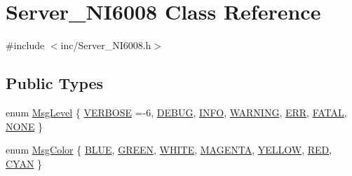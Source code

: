 \hypertarget{classServer__NI6008}{}\section{Server\+\_\+\+N\+I6008 Class Reference}
\label{classServer__NI6008}


{\ttfamily \#include $<$inc/\+Server\+\_\+\+N\+I6008.\+h$>$}

\subsection*{Public Types}
\begin{DoxyCompactItemize}
\item 
enum \hyperlink{classServer__NI6008_af1e3e3bac26355a746b5d2e548fe25be}{Msg\+Level} \{ \newline
\hyperlink{classServer__NI6008_af1e3e3bac26355a746b5d2e548fe25bea58fcd852dfcff4011a32756eda28852b}{V\+E\+R\+B\+O\+SE} =-\/6, 
\hyperlink{classServer__NI6008_af1e3e3bac26355a746b5d2e548fe25bead3eef0ad5b826981e274ce214fd3a6d3}{D\+E\+B\+UG}, 
\hyperlink{classServer__NI6008_af1e3e3bac26355a746b5d2e548fe25bea218489470a9743b7d475e86e13ea219d}{I\+N\+FO}, 
\hyperlink{classServer__NI6008_af1e3e3bac26355a746b5d2e548fe25bead7775b9a40b2a58fe2547fe9c2617093}{W\+A\+R\+N\+I\+NG}, 
\newline
\hyperlink{classServer__NI6008_af1e3e3bac26355a746b5d2e548fe25bea23728be8768fe4c119fb61ad427ed5ba}{E\+RR}, 
\hyperlink{classServer__NI6008_af1e3e3bac26355a746b5d2e548fe25bea678aa96ea2189f7d6ab602160fa49b8b}{F\+A\+T\+AL}, 
\hyperlink{classServer__NI6008_af1e3e3bac26355a746b5d2e548fe25bea26813832bb3e07669c3f2e68e2b9690e}{N\+O\+NE}
 \}
\item 
enum \hyperlink{classServer__NI6008_abee9aec1c5054cd3223d4a1e5e4a7ad9}{Msg\+Color} \{ \newline
\hyperlink{classServer__NI6008_abee9aec1c5054cd3223d4a1e5e4a7ad9a87f786fd497d96c2772b919191814893}{B\+L\+UE}, 
\hyperlink{classServer__NI6008_abee9aec1c5054cd3223d4a1e5e4a7ad9a68bc466d3117463d6348299d532b2d45}{G\+R\+E\+EN}, 
\hyperlink{classServer__NI6008_abee9aec1c5054cd3223d4a1e5e4a7ad9aa89fb8138b784b74e19d3c91a4e57999}{W\+H\+I\+TE}, 
\hyperlink{classServer__NI6008_abee9aec1c5054cd3223d4a1e5e4a7ad9a63a33102efe5a43b2004daeb24ac9393}{M\+A\+G\+E\+N\+TA}, 
\newline
\hyperlink{classServer__NI6008_abee9aec1c5054cd3223d4a1e5e4a7ad9a5595845a9cce91475fd2c84dfc0244a1}{Y\+E\+L\+L\+OW}, 
\hyperlink{classServer__NI6008_abee9aec1c5054cd3223d4a1e5e4a7ad9ac0ceda8a3474b33193dd1d704d24ecb0}{R\+ED}, 
\hyperlink{classServer__NI6008_abee9aec1c5054cd3223d4a1e5e4a7ad9a17e88e209cae3fc66ebd0ede07ec4431}{C\+Y\+AN}
 \}
\end{DoxyCompactItemize}
